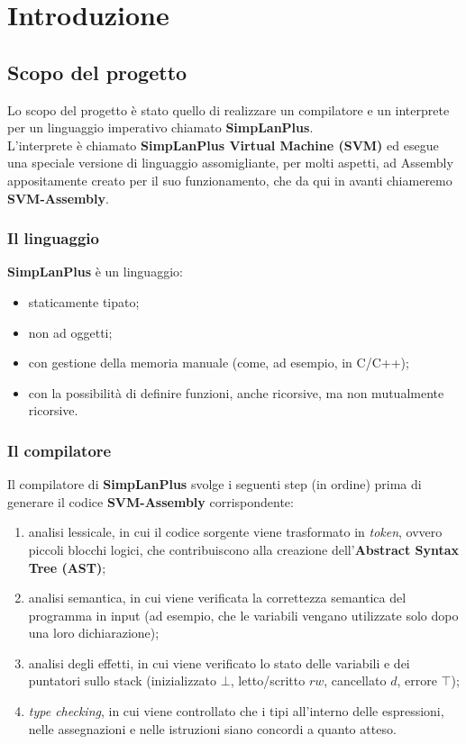 \documentclass[../report.tex]{subfiles}
\begin{document}
\chapter{Introduzione}\label{c:introduzione}
\section{Scopo del progetto}\label{s:scopo-progetto}
Lo scopo del progetto è stato quello di realizzare un compilatore e un interprete per un linguaggio imperativo chiamato \textbf{SimpLanPlus}.\\
\noindent
L'interprete è chiamato \textbf{SimpLanPlus Virtual Machine (SVM)} ed esegue una speciale versione di linguaggio assomigliante, per molti aspetti, ad Assembly appositamente creato per il suo funzionamento, che da qui in avanti chiameremo \textbf{SVM-Assembly}.

\subsection{Il linguaggio}\label{ss:linguaggio}
\textbf{SimpLanPlus} è un linguaggio:
\begin{itemize}
    \item staticamente tipato;
    \item non ad oggetti;
    \item con gestione della memoria manuale (come, ad esempio, in C/C++);
    \item con la possibilità di definire funzioni, anche ricorsive, ma non mutualmente ricorsive.
\end{itemize}

\subsection{Il compilatore}\label{ss:compilatore}
Il compilatore di \textbf{SimpLanPlus} svolge i seguenti step (in ordine) prima di generare il codice \textbf{SVM-Assembly} corrispondente:
\begin{enumerate}
    \item analisi lessicale, in cui il codice sorgente viene trasformato in \textit{token}, ovvero piccoli blocchi logici, che contribuiscono alla creazione dell'\textbf{Abstract Syntax Tree (AST)};
    \item analisi semantica, in cui viene verificata la correttezza semantica del programma in input (ad esempio, che le variabili vengano utilizzate solo dopo una loro dichiarazione);
    \item analisi degli effetti, in cui viene verificato lo stato delle variabili e dei puntatori sullo stack (inizializzato $\bot$, letto/scritto $rw$, cancellato $d$, errore $\top$);
    \item \textit{type checking}, in cui viene controllato che i tipi all'interno delle espressioni, nelle assegnazioni e nelle istruzioni siano concordi a quanto atteso.
\end{enumerate}
\end{document}
